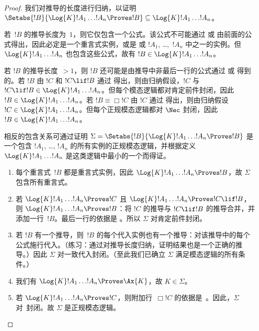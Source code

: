 \documentclass[../../../include/open-logic-section]{subfiles}
\begin{document}
\begin{proof}
  我们对推导的长度进行归纳，以证明 $\Setabs{!B}{\Log{K} !A_1 \dots !A_n \Proves !B} \subseteq
  \Log{K} !A_1 \dots !A_n$。

  若~$!B$ 的推导长度为~$1$，则它仅包含一个公式。该公式不可能通过 \MP{} 或 \Nec 由前面的公式得出，因此必定是一个重言式实例，或是  或 $!A_1$, \dots,~$!A_n$ 中之一的实例。但 $\Log{K}!A_1\dots!A_n$ 也包含这些公式，故有 $!B \in \Log{K}!A_1 \dots !A_n$。

  若 $!B$ 的推导长度~$> 1$，则 $!B$ 还可能是由推导中非最后一行的公式通过 \MP{} 或 \Nec{} 得到的。若 $!B$ 由 $!C$ 和 $!C \lif !B$ 通过 \MP 得出，则由归纳假设，$!C$ 与 $!C \lif !B \in
  \Log{K}!A_1 \dots !A_n$。但每个模态逻辑都对肯定前件封闭，因此 $!B \in \Log{K}!A_1 \dots
  !A_n$。若 $!B \equiv \Box !C$ 由 $!C$ 通过 \Nec 得出，则由归纳假设 $!C
  \in \Log{K}!A_1 \dots !A_n$。但每个正规模态逻辑都对 $\Nec$ 封闭，因此 $!B \in
  \Log{K}!A_1\dots!A_n$。

  相反的包含关系可通过证明 $\Sigma = \Setabs{!B}{\Log{K} !A_1 \dots !A_n \Proves !B }$ 是一个包含 $!A_1$, \dots, $!A_n$ 的所有实例的正规模态逻辑，并根据定义 $\Log{K} !A_1 \dots !A_n$ 是这类逻辑中最小的一个而得证。
  \begin{enumerate}
    \item 每个重言式~$!B$ 都是重言式实例，因此 $\Log{K}!A_1\dots!A_n \Proves !B$，故 $\Sigma$ 包含所有重言式。
    \item 若 $\Log{K}!A_1\dots!A_n \Proves !C$ 且 $\Log{K}!A_1\dots!A_n \Proves !C \lif !B$，则 $\Log{K}!A_1\dots!A_n \Proves !B$：将 $!C$ 的推导与 $!C \lif !B$ 的推导合并，并添加一行~$!B$。最后一行的依据是 \MP{}。所以 $\Sigma$ 对肯定前件封闭。
    \item 若 $!B$ 有一个推导，则~$!B$ 的每个代入实例也有一个推导：对该推导中的每个公式施行代入。（练习：通过对推导长度归纳，证明结果也是一个正确的推导。）因此 $\Sigma$ 对一致代入封闭。（至此我们已确立 $\Sigma$ 满足模态逻辑的所有条件。）
    \item 我们有 $\Log{K}!A_1\dots!A_n \Proves \Ax{K}$，故 $K \in \Sigma$。
    \item 若 $\Log{K}!A_1\dots!A_n \Proves !C$，则附加行~$\Box !C$ 的依据是~\Nec。因此，$\Sigma$ 对~\Nec 封闭。故 $\Sigma$ 是正规模态逻辑。
  \end{enumerate}
\end{proof}
\end{document}
